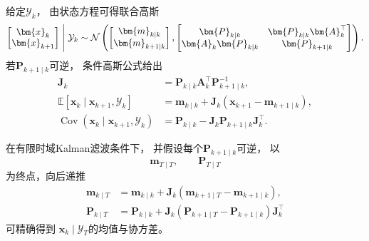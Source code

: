 给定$\mathcal{Y}_{k}$， 由状态方程可得联合高斯
\[
	\begin{bmatrix}
		\bm{x}_{k}   \\
		\bm{x}_{k+1}
	\end{bmatrix}
	\Biggm|\mathcal{Y}_{k}\sim \mathcal{N}\left(
	\begin{bmatrix}
		\bm{m}_{k\mid k}   \\
		\bm{m}_{k+1\mid k}
	\end{bmatrix},
	\begin{bmatrix}
		\bm{P}_{k\mid k}           & \bm{P}_{k\mid k}\bm{A}_{k}^{\top} \\
		\bm{A}_{k}\bm{P}_{k\mid k} & \bm{P}_{k+1\mid k}
	\end{bmatrix}
	\right).
\]
若$\bm{P}_{k+1\mid k}$可逆， 条件高斯公式给出
\begin{align}
	\bm{J}_{k}                                                       & = \bm{P}_{k\mid k}\bm{A}_{k}^{\top}\bm{P}_{k+1\mid k}^{-1}, \label{eq:dynamical-rts-gain}                                   \\
	\mathbb{E}[ \bm{x}_{k}\mid \bm{x}_{k+1},\mathcal{Y}_{k}]         & = \bm{m}_{k\mid k}+ \bm{J}_{k}(\bm{x}_{k+1}-\bm{m}_{k+1\mid k}), \label{eq:dynamical-rts-one-step-conditional-mean}         \\
	\operatorname{Cov}( \bm{x}_{k}\mid \bm{x}_{k+1},\mathcal{Y}_{k}) & = \bm{P}_{k\mid k}- \bm{J}_{k}\bm{P}_{k+1\mid k}\bm{J}_{k}^{\top}. \label{eq:dynamical-rts-one-step-conditional-covariance}
\end{align}

\begin{theorem}[有限时域RTS平滑]
	\label{thm:dynamical-rts-smoother} 在有限时域Kalman滤波条件下， 并假设每个$\bm{P}
	_{k+1\mid k}$可逆， 以
	\[
		\bm{m}_{T\mid T},\qquad \bm{P}_{T\mid T}
	\]
	为终点，向后递推
	\begin{align}
		\bm{m}_{k\mid T} & = \bm{m}_{k\mid k}+ \bm{J}_{k}(\bm{m}_{k+1\mid T}-\bm{m}_{k+1\mid k}), \label{eq:dynamical-rts-smoothed-mean}                       \\
		\bm{P}_{k\mid T} & = \bm{P}_{k\mid k}+ \bm{J}_{k}(\bm{P}_{k+1\mid T}-\bm{P}_{k+1\mid k}) \bm{J}_{k}^{\top}\label{eq:dynamical-rts-smoothed-covariance}
	\end{align}
	可精确得到 $\bm{x}_{k}\mid\mathcal{Y}_{T}$的均值与协方差。
\end{theorem}

